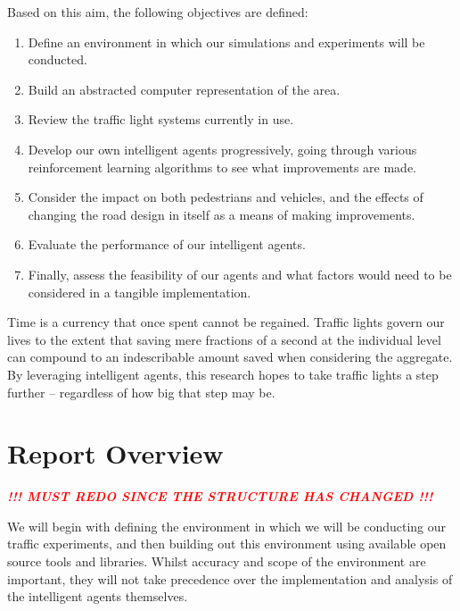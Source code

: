 \documentclass[a4paper]{report}
\begin{document}
Based on this aim, the following objectives are defined:

\begin{enumerate}
  \item Define an environment in which our simulations and experiments will be conducted.
  
  \item Build an abstracted computer representation of the area.
  
  \item Review the traffic light systems currently in use.
  
  \item Develop our own intelligent agents progressively, going through various reinforcement learning algorithms to see what improvements are made.
  
  \item Consider the impact on both pedestrians and vehicles, and the effects of changing the road design in itself as a means of making improvements.
  
  \item Evaluate the performance of our intelligent agents.
  
  \item Finally, assess the feasibility of our agents and what factors would need to be considered in a tangible implementation.
\end{enumerate}

Time is a currency that once spent cannot be regained. Traffic lights govern our lives to the extent that saving mere fractions of a second at the individual level can compound to an indescribable amount saved when considering the aggregate. By leveraging intelligent agents, this research hopes to take traffic lights a step further -- regardless of how big that step may be.

\section{Report Overview}

\textcolor{red}{\textbf{\emph{!!! MUST REDO SINCE THE STRUCTURE HAS CHANGED !!!}}}

We will begin with defining the environment in which we will be conducting our traffic experiments, and then building out this environment using available open source tools and libraries. Whilst accuracy and scope of the environment are important, they will not take precedence over the implementation and analysis of the intelligent agents themselves.
\end{document}
